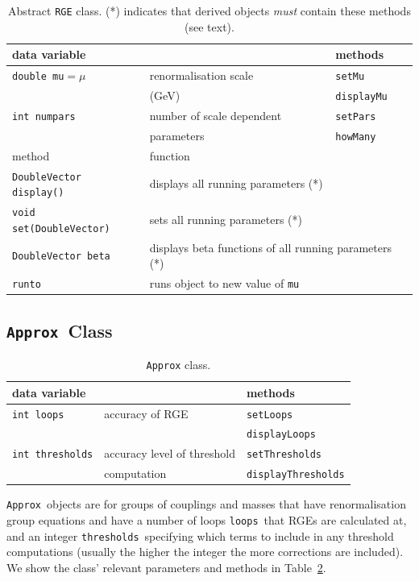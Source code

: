 \documentclass{article}
\def\code#1{\small{\tt #1}\normalsize}
\begin{document}
\begin{table}\begin{center}
\begin{tabular}{lll} 
data variable & & methods \\ \hline
\code{double mu}$=\mu$ & renormalisation scale & \code{setMu} \\
& (GeV) &  \code{displayMu} \\ \hline
\code{int numpars} & number of scale dependent & \code{setPars} \\
 & parameters & \code{howMany} \\ \hline
method & \multicolumn{2}{l}{function} \\ \hline
\code{DoubleVector display()} & \multicolumn{2}{l}{displays all running
parameters (*)} \\ 
\code{void set(DoubleVector)} & \multicolumn{2}{l}{sets all running
parameters (*)} \\ 
\code{DoubleVector beta} & \multicolumn{2}{l}{displays beta functions of all
running parameters (*)} \\ 
\code{runto} & \multicolumn{2}{l}{runs object to new value of
\code{mu}} \\ 
\end{tabular}\caption{\label{tab:rge} Abstract \code{RGE} class. (*) indicates that derived objects {\em must}\/
contain these methods (see text). }\end{center}\end{table}

\subsection{\code{Approx}~Class}

\begin{table}\begin{center}
\begin{tabular}{lll} 
data variable & & methods \\ \hline
\code{int loops} & accuracy of RGE & \code{setLoops} \\
 & & \code{displayLoops} \\ \hline
\code{int thresholds} & accuracy level of threshold &
\code{setThresholds} \\  & computation & \code{displayThresholds}\\
\end{tabular}
\caption{\label{tab:approx} \code{Approx} class.}
\end{center}
\end{table}
\code{Approx}~objects are for groups of couplings and masses that have
renormalisation group equations and have a number of loops
\code{loops}~that RGEs are calculated at, and an integer
\code{thresholds}~specifying 
which terms to include in any threshold computations (usually the higher the
integer the more corrections are included). We show the class' relevant
parameters and methods in Table~\ref{tab:approx}.
\end{document}
